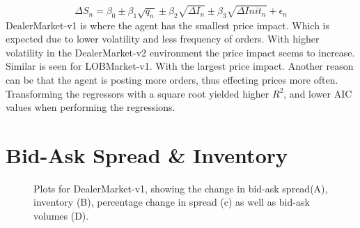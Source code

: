 \documentclass{kththesis}
\theoremstyle{definition}
\begin{document}
\begin{equation}
    \Delta S_{n} = \beta_0 \pm \beta_1\sqrt{q_n} \pm \beta_2\sqrt{\Delta I_n} \pm \beta_3\sqrt{\Delta Init_{n}} + \epsilon_n
    \label{eq:regs}
\end{equation}
\newline
\newline
DealerMarket-v1 is where the agent has the smallest price impact. Which is expected due to lower volatility and less frequency of orders. With higher volatility in the DealerMarket-v2 environment the price impact seems to increase. Similar is seen for LOBMarket-v1. With the largest price impact. Another reason can be that the agent is posting more orders, thus effecting prices more often.  Transforming the regressors with a square root yielded higher $R^{2}$, and lower AIC values when performing the regressions.


\section{Bid-Ask Spread \& Inventory}
\begin{figure}
	    	\centering
		
		\caption{Plots for DealerMarket-v1, showing the change in bid-ask spread(A), inventory (B), percentage change in spread (c) as well as bid-ask volumes (D). }
		\label{fig:dm12}
\end{figure}
\end{document}
